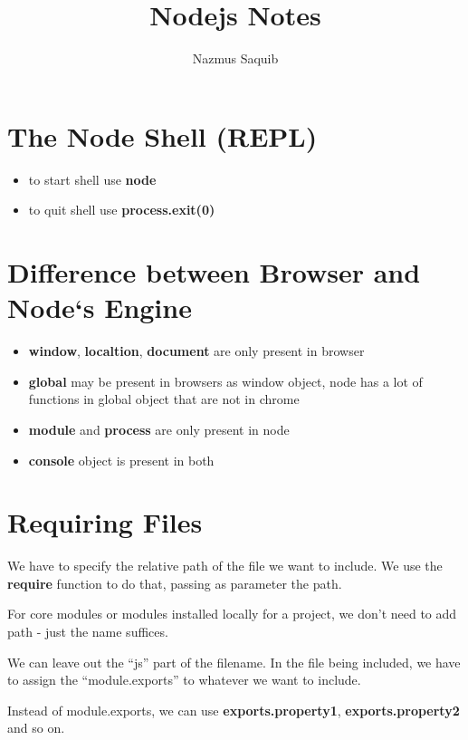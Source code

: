 \documentclass[12pt, a4paper]{article}
\begin{document}
\title{Nodejs Notes}
\author{Nazmus Saquib}

\maketitle

\section{The Node Shell (REPL)}
\begin{itemize}
\item to start shell use \textbf{node}
\item to quit shell use \textbf{process.exit(0)}
\end{itemize}

\section{Difference between Browser and Node`s Engine}
\begin{itemize}
\item \textbf{window}, \textbf{localtion}, \textbf{document} are only present in browser
\item \textbf{global} may be present in browsers as window object, node has a lot of functions in global object that are not in chrome
\item \textbf{module} and \textbf{process} are only present in node
\item \textbf{console} object is present in both
\end{itemize}


\section{Requiring Files}
We have to specify the relative path of the file we want to include.
We use the \textbf{require} function to do that, passing as parameter the path.

For core modules or modules installed locally for a project, we don't need to add path - just the name suffices.

We can leave out the ``js'' part of the filename.
In the file being included, we have to assign the ``module.exports'' to whatever we want to include.

Instead of module.exports, we can use \textbf{exports.property1}, \textbf{exports.property2} and so on.
\end{document}
